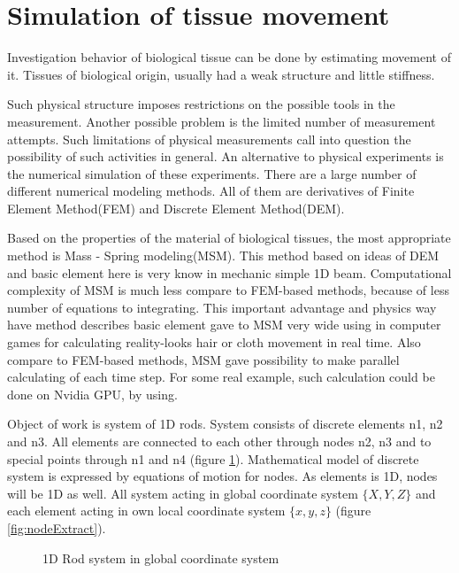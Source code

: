 \chapter*{Simulation of tissue movement} 
Investigation behavior of biological tissue can be done by estimating movement
of it. Tissues of biological origin, usually had a weak structure and little
stiffness.
\par
Such physical structure imposes restrictions on the possible tools in the
measurement. Another possible problem is the limited number of measurement
attempts. Such limitations of physical measurements call into question the
possibility of such activities in general. An alternative to physical
experiments is the numerical simulation of these experiments. There are a large
number of different numerical modeling methods. All of them are derivatives of
Finite Element Method(FEM) and Discrete Element Method(DEM).
\par
Based on the properties of the material of biological tissues, the most
appropriate method is Mass - Spring modeling(MSM). This method based on ideas of
DEM and basic element here is very know in mechanic simple 1D beam.
Computational complexity of MSM is much less compare to FEM-based methods,
because of less number of equations to integrating. This important advantage and
physics way have method describes basic element gave to MSM very wide using in
computer games for calculating reality-looks hair or cloth movement in real
time. Also compare to FEM-based methods, MSM gave possibility to make parallel
calculating of each time step. For some real example, such calculation could be
done on Nvidia GPU, by using. \cite{Rasmusson2008} \cite{Amorim2012}
\par
Object of work is system of 1D rods. System consists of discrete elements n1, n2
and n3. All elements are connected to each other through nodes n2, n3 and to
special points through n1 and n4 (figure \ref{fig:rodSystem}). Mathematical
model of discrete system is expressed by equations of motion for nodes. As
elements is 1D, nodes will be 1D as well. All system acting in global coordinate
system $\{X, Y, Z\}$ and each element acting in own local coordinate system
$\{x,y,z\}$ (figure \ref{fig:nodeExtract}).\par
\begin{figure}[ht]
  \centering
      
  \caption{1D Rod system in global coordinate system}\label{fig:rodSystem}      
\end{figure}
